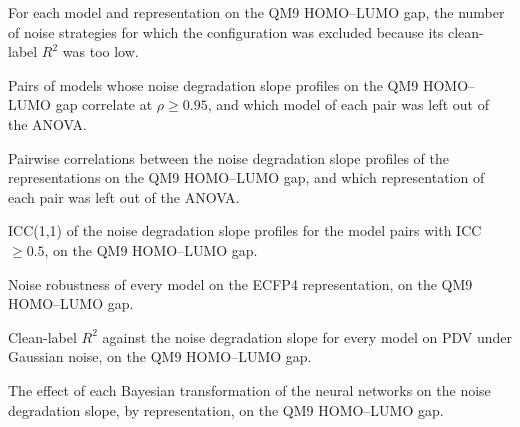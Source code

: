 \label{app:noise:sec:excluded_configurations}
For each model and representation on the QM9 HOMO--LUMO gap, the number of noise strategies for which the configuration was excluded because its clean-label $R^2$ was too low.


\label{app:noise:sec:model_redundancy}
Pairs of models whose noise degradation slope profiles on the QM9 HOMO--LUMO gap correlate at $\rho \geq 0.95$, and which model of each pair was left out of the ANOVA.


\label{app:noise:sec:representation_redundancy}
Pairwise correlations between the noise degradation slope profiles of the representations on the QM9 HOMO--LUMO gap, and which representation of each pair was left out of the ANOVA.


\label{app:noise:sec:model_icc}
ICC(1,1) of the noise degradation slope profiles for the model pairs with ICC $\geq 0.5$, on the QM9 HOMO--LUMO gap.


\label{app:noise:sec:ecfp4_overview}
Noise robustness of every model on the ECFP4 representation, on the QM9 HOMO--LUMO gap.


\label{app:noise:sec:clean_r2_vs_robustness}
Clean-label $R^2$ against the noise degradation slope for every model on PDV under Gaussian noise, on the QM9 HOMO--LUMO gap.


\label{app:noise:sec:bayesian_transformation_tests}
The effect of each Bayesian transformation of the neural networks on the noise degradation slope, by representation, on the QM9 HOMO--LUMO gap.


